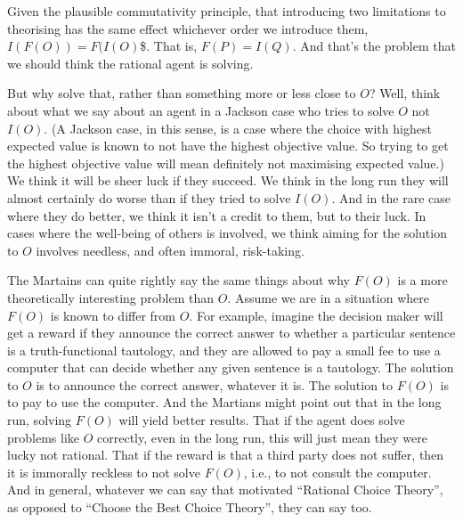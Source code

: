 \documentclass[11pt,]{book}
\begin{document}
Given the plausible commutativity principle, that introducing two limitations to theorising has the same effect whichever order we introduce them, \(I(F(O)) = F(I(O)\)\$. That is, \(F(P) = I(Q)\). And that's the problem that we should think the rational agent is solving.

But why solve that, rather than something more or less close to \(O\)? Well, think about what we say about an agent in a Jackson case who tries to solve \(O\) not \(I(O)\). (A Jackson case, in this sense, is a case where the choice with highest expected value is known to not have the highest objective value. So trying to get the highest objective value will mean definitely not maximising expected value.) We think it will be sheer luck if they succeed. We think in the long run they will almost certainly do worse than if they tried to solve \(I(O)\). And in the rare case where they do better, we think it isn't a credit to them, but to their luck. In cases where the well-being of others is involved, we think aiming for the solution to \(O\) involves needless, and often immoral, risk-taking.

The Martains can quite rightly say the same things about why \(F(O)\) is a more theoretically interesting problem than \(O\). Assume we are in a situation where \(F(O)\) is known to differ from \(O\). For example, imagine the decision maker will get a reward if they announce the correct answer to whether a particular sentence is a truth-functional tautology, and they are allowed to pay a small fee to use a computer that can decide whether any given sentence is a tautology. The solution to \(O\) is to announce the correct answer, whatever it is. The solution to \(F(O)\) is to pay to use the computer. And the Martians might point out that in the long run, solving \(F(O)\) will yield better results. That if the agent does solve problems like \(O\) correctly, even in the long run, this will just mean they were lucky not rational. That if the reward is that a third party does not suffer, then it is immorally reckless to not solve \(F(O)\), i.e., to not consult the computer. And in general, whatever we can say that motivated ``Rational Choice Theory'', as opposed to ``Choose the Best Choice Theory'', they can say too.
\end{document}
